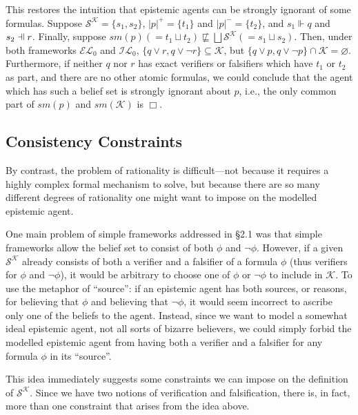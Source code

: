 \documentclass[12pt]{article}
\newcommand{\fal}{\mathrel{\text{\reflectbox{$\Vdash$}}}}
\newcommand{\ver}{\Vdash}
\newcommand{\K}{\mathcal{K}}
\newcommand{\SK}{\mathcal{S}^\mathcal{K}}
\begin{document}
\par
This restores the intuition that epistemic agents can be strongly ignorant of some formulas. Suppose $\SK = \{s_1, s_2\}$, $|p|^+ = \{t_1\}$ and $|p|^- = \{t_2\}$, and $s_1 \ver q$ and $s_2 \fal r$. Finally, suppose $sm(p) (= t_1 \sqcup t_2) \not\sqsubseteq \bigsqcup \SK (= s_1 \sqcup s_2)$. Then, under both frameworks $\mathcal{EL}_0$ and $\mathcal{IL}_0$, $\{q \lor r, q \lor \lnot r\} \subseteq \K$, but $\{q \lor p, q \lor \lnot p\} \cap \K = \varnothing$. Furthermore, if neither $q$ nor $r$ has exact verifiers or falsifiers which have $t_1$ or $t_2$ as part, and there are no other atomic formulas, we could conclude that the agent which has such a belief set is strongly ignorant about $p$, i.e., the only common part of $sm(p)$ and $sm(\K)$ is $\Box$. 

\subsection{Consistency Constraints}
By contrast, the problem of rationality is difficult---not because it requires a highly complex formal mechanism to solve, but because there are so many different degrees of rationality one might want to impose on the modelled epistemic agent. 
\par
One main problem of simple frameworks addressed in \S 2.1 was that simple frameworks allow the belief set to consist of both $\phi$ and $\lnot \phi$. However, if a given $\SK$ already consists of both a verifier and a falsifier of a formula $\phi$ (thus verifiers for $\phi$ and $\lnot \phi$), it would be arbitrary to choose one of $\phi$ or $\lnot \phi$ to include in $\K$. To use the metaphor of ``source'': if an epistemic agent has both sources, or reasons, for believing that $\phi$ and believing that $\lnot \phi$, it would seem incorrect to ascribe only one of the beliefs to the agent. Instead, since we want to model a somewhat ideal epistemic agent, not all sorts of bizarre believers, we could simply forbid the modelled epistemic agent from having both a verifier and a falsifier for any formula $\phi$ in its ``source''. 
\par
This idea immediately suggests some constraints we can impose on the definition of $\SK$. Since we have two notions of verification and falsification, there is, in fact, more than one constraint that arises from the idea above. 
\end{document}
